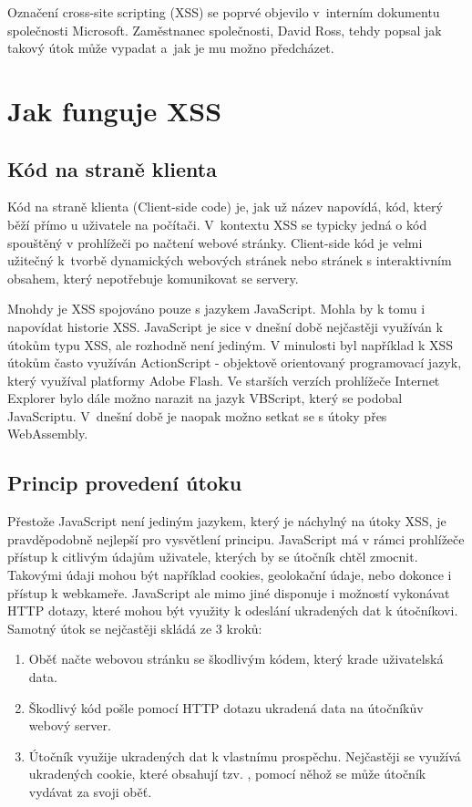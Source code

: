 \documentclass[11pt,conference]{IEEEtran}
\begin{document}
Označení cross-site scripting (XSS) se poprvé objevilo  v~interním dokumentu  společnosti Microsoft. Zaměstnanec společnosti, David Ross, tehdy popsal jak takový útok může vypadat a~jak je mu možno předcházet.~\cite{Grossman2007}


\section{Jak funguje XSS}
\subsection{Kód na straně klienta}
Kód na straně klienta (Client-side code) je, jak už název napovídá, kód, který běží přímo u uživatele na počítači. V~kontextu XSS se typicky jedná o kód spouštěný v prohlížeči po načtení webové stránky. Client-side kód je velmi užitečný k~tvorbě dynamických webových stránek nebo stránek s interaktivním obsahem, který nepotřebuje komunikovat se servery.~\cite{XSS-cloudflare}

Mnohdy je XSS spojováno pouze s jazykem JavaScript. Mohla by k tomu i napovídat historie XSS. JavaScript je sice v dnešní době nejčastěji využíván k útokům typu XSS, ale rozhodně není jediným. V minulosti byl například k XSS útokům často využíván ActionScript - objektově orientovaný programovací jazyk, který využíval platformy Adobe Flash. Ve starších verzích prohlížeče Internet Explorer bylo dále možno narazit na jazyk VBScript, který se podobal JavaScriptu. V~dnešní době je naopak možno setkat se s útoky přes WebAssembly.

\subsection{Princip provedení útoku}
Přestože JavaScript není jediným jazykem, který je náchylný na útoky XSS, je pravděpodobně nejlepší pro vysvětlení principu. JavaScript má v rámci prohlížeče přístup k citlivým údajům uživatele, kterých by se útočník chtěl zmocnit. Takovými údaji mohou být například cookies, geolokační údaje, nebo dokonce i přístup k webkameře. JavaScript ale mimo jiné disponuje i možností vykonávat HTTP dotazy, které mohou být využity k odeslání ukradených dat k útočníkovi. Samotný útok se nejčastěji skládá ze 3 kroků:
\begin{enumerate}
    \item Oběť načte webovou stránku se škodlivým kódem, který krade uživatelská data.
    
    \item Škodlivý kód pošle pomocí HTTP dotazu ukradená data na útočníkův webový server.

    \item Útočník využije ukradených dat k vlastnímu prospěchu. Nejčastěji se využívá ukradených cookie, které obsahují tzv. , pomocí něhož se může útočník vydávat za svoji oběť.~\cite{XSS-cloudflare}
    
\end{enumerate}
\end{document}
